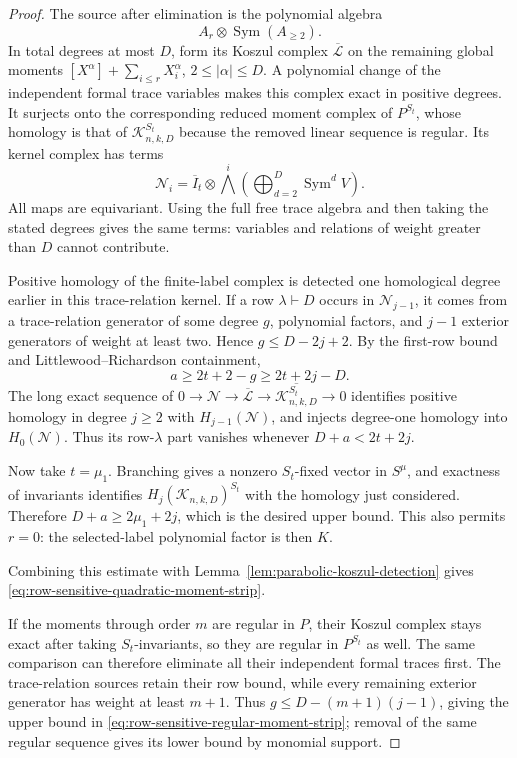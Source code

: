 \begin{proof}
The source after elimination is the polynomial algebra
\[
       A_r\otimes\operatorname{Sym}(A_{\ge2}).
\]
In total degrees at most $D$, form its Koszul complex
$\overline{\mathcal L}$ on the remaining global moments
$[X^\alpha]+\sum_{i\le r}X_i^\alpha$, $2\le|\alpha|\le D$.
A polynomial change of the independent formal trace variables
makes this complex exact in positive degrees.  It surjects onto
the corresponding reduced moment complex of $P^{S_t}$, whose
homology is that of $\mathcal K_{n,k,D}^{S_t}$ because the removed
linear sequence is regular.  Its kernel complex has terms
\[
 \mathcal N_i=\overline I_t\otimes
           \bigwedge^i\!\left(\bigoplus_{d=2}^D
                                      \operatorname{Sym}^dV\right).
\]
All maps are equivariant.  Using the full free trace algebra and
then taking the stated degrees gives the same terms: variables
and relations of weight greater than $D$ cannot contribute.

Positive homology of the finite-label complex is detected one
homological degree earlier in this trace-relation kernel.
If a row $\lambda\vdash D$ occurs in $\mathcal N_{j-1}$,
it comes from a trace-relation generator of some degree $g$,
polynomial factors, and $j-1$ exterior generators of weight at
least two.  Hence $g\le D-2j+2$.  By the first-row bound and
Littlewood--Richardson containment,
\[
        a\ge2t+2-g\ge2t+2j-D.
\]
The long exact sequence of
$0\to\mathcal N\to\overline{\mathcal L}\to
\overline{\mathcal K_{n,k,D}^{S_t}}\to0$ identifies positive homology in
degree $j\ge2$ with $H_{j-1}(\mathcal N)$, and injects degree-one
homology into $H_0(\mathcal N)$.  Thus its row-$\lambda$ part
vanishes whenever $D+a<2t+2j$.

Now take $t=\mu_1$.  Branching gives a nonzero $S_t$-fixed
vector in $S^\mu$, and exactness of invariants identifies
$H_j(\mathcal K_{n,k,D})^{S_t}$ with the homology just considered.
Therefore $D+a\ge2\mu_1+2j$, which is the desired upper bound.
This also permits $r=0$: the selected-label polynomial factor is
then $K$.

Combining this estimate with
Lemma~\ref{lem:parabolic-koszul-detection} gives
\eqref{eq:row-sensitive-quadratic-moment-strip}.

If the moments through order $m$ are regular in $P$, their Koszul
complex stays exact after taking $S_t$-invariants, so they are
regular in $P^{S_t}$ as well.  The same comparison can therefore
eliminate all their independent formal traces first.  The
trace-relation sources retain their row bound, while every
remaining exterior generator has weight at least $m+1$.
Thus $g\le D-(m+1)(j-1)$, giving the upper bound in
\eqref{eq:row-sensitive-regular-moment-strip}; removal of the same
regular sequence gives its lower bound by monomial support.
\end{proof}

